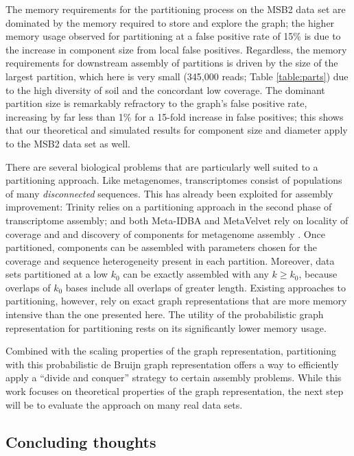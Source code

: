 \documentclass{pnastwo}
\begin{document}
\begin{article}
The memory requirements for the partitioning process on the MSB2 data
set are dominated by the memory required to store and explore the
graph; the higher memory usage observed for partitioning at a false positive rate
of 15\% is due to the increase in component size from local false
positives.  Regardless, the memory requirements for downstream assembly
of partitions is driven by the size of the largest partition, which
here is very small (345,000 reads; Table \ref{table:parts}) due to the
high diversity of soil and the concordant low coverage.  The
dominant partition size is remarkably refractory to the graph's false
positive rate, increasing by far less than 1\% for a 15-fold increase
in false positives; this shows that our theoretical and
simulated results for component size and diameter apply to the MSB2 data set
as well.


There are several biological problems that are particularly well
suited to a partitioning approach.  Like metagenomes, transcriptomes
consist of populations of many {\em disconnected} sequences.  This has
already been exploited for assembly improvement: Trinity relies on a
partitioning approach in the second phase of transcriptome assembly;
and both Meta-IDBA and MetaVelvet rely on locality of coverage and and
discovery of components for metagenome assembly
\cite{metavelvet,pubmed21685107,trinity}.  Once partitioned, components
can be assembled with parameters chosen for the coverage and sequence
heterogeneity present in each partition.  Moreover, data sets partitioned
at a low $k_0$ can be exactly assembled with any $k \ge k_0$, because
overlaps of $k_0$ bases include all overlaps of greater length.
Existing approaches to partitioning, however,
rely on exact graph representations that are more memory intensive
than the one presented here.  The utility of the probabilistic graph
representation for partitioning rests on its significantly lower
memory usage.

Combined with the scaling
properties of the graph representation, partitioning with this probabilistic
de Bruijn graph representation offers a way to
efficiently apply a ``divide and conquer'' strategy to certain
assembly problems.  While this work focuses on theoretical properties
of the graph representation, the next step will be to evaluate the approach
on many real data sets.

\subsection{Concluding thoughts}


\end{article}
\end{document}
